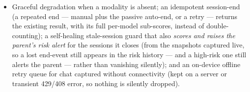 \documentclass[11pt,a4paper]{article}
\begin{document}
\begin{itemize}[leftmargin=1.4em]
        at full priority.
  \item Graceful degradation when a modality is absent; an idempotent session-end (a
        repeated end --- manual plus the passive auto-end, or a retry --- returns the
        existing result, with its full per-model sub-scores, instead of double-counting);
        a self-healing stale-session guard that also \emph{scores and raises the parent's
        risk alert} for the sessions it closes (from the snapshots captured live, so a
        lost end-event still appears in the risk history --- and a high-risk one still
        alerts the parent --- rather than vanishing silently); and an on-device offline
        retry queue for chat captured without connectivity (kept on a server or transient
        429/408 error, so nothing is silently dropped).
\end{itemize}
\end{document}
